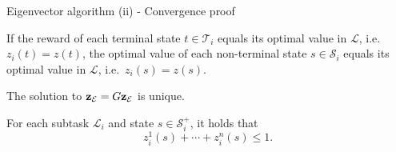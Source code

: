 \documentclass{beamer}
\theoremstyle{mystyle}
\newcommand{\cE}{\mathcal{E}}
\newcommand{\cL}{\mathcal{L}}
\newcommand{\cR}{\mathcal{R}}
\newcommand{\cS}{\mathcal{S}}
\newcommand{\cT}{\mathcal{T}}
\begin{document}
\begin{frame}{Eigenvector algorithm (ii) - Convergence proof}

\begin{lemma}[1]
    If the reward of each terminal state $t\in\cT_i$ equals its optimal value in $\cL$, i.e.~$z_i(t)=z(t)$, the optimal value of each non-terminal state $s\in\cS_i$ equals its optimal value in $\cL$, i.e.~$z_i(s)=z(s)$.
\end{lemma}

\begin{lemma}[2]
    The solution to  ${\bf z}_\cE=G{\bf z}_\cE$ is unique.
\end{lemma}
    

\begin{lemma}[3]
    For each subtask $\cL_i$ and state $s\in\cS_i^+$, it holds that \[ z_i^1(s)+\cdots+z_i^n(s)\leq 1 .\]
\end{lemma}

\end{frame}

%
%
%
%
%
%
%    
\end{document}
